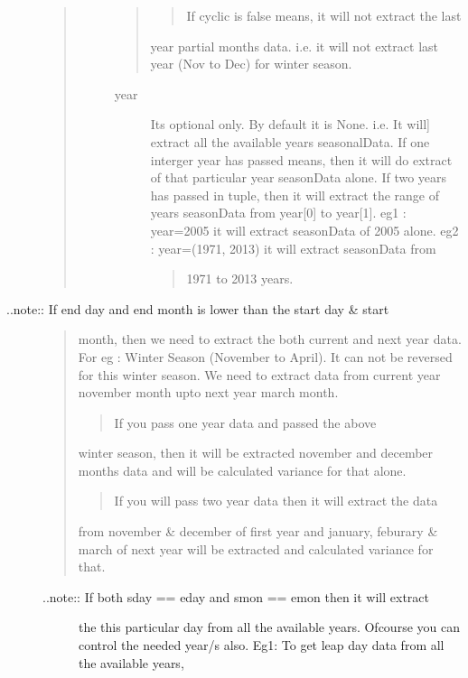 \documentclass[letterpaper,10pt,english]{sphinxmanual}
\begin{document}
\begin{fulllineitems}
\begin{fulllineitems}
\begin{description}
\begin{quote}
\begin{description}
\begin{quote}
\begin{quote}
If cyclic is false means, it will not extract the last
\end{quote}

year partial months data. i.e. it will not extract last year
(Nov to Dec) for winter season.
\end{quote}
\begin{description}
\item[{year}] \leavevmode{[}Its optional only. By default it is None. i.e. It will{]}
extract all the available years seasonalData.
If one interger year has passed means, then it will do
extract of that particular year seasonData alone.
If two years has passed in tuple, then it will extract
the range of years seasonData from year{[}0{]} to year{[}1{]}.
eg1 : year=2005 it will extract seasonData of 2005 alone.
eg2 : year=(1971, 2013) it will extract seasonData from
\begin{quote}

1971 to 2013 years.
\end{quote}

\end{description}

\end{description}
\end{quote}

\item[{..note:: If end day and end month is lower than the start day \& start}] \leavevmode\begin{quote}

month, then we need to extract the both current and next year
data. For eg : Winter Season (November to April).
It can not be reversed for this winter season. We need to
extract data from current year november month upto next year
march month.
\begin{quote}

If you pass one year data and passed the above
\end{quote}

winter season, then it will be extracted november and december
months data and will be calculated variance for that alone.
\begin{quote}

If you will pass two year data then it will extract the data
\end{quote}

from november \& december of first year and january, feburary \&
march of next year will be extracted and calculated variance
for that.
\end{quote}
\begin{description}
\item[{..note:: If both sday == eday and smon == emon then it will extract}] \leavevmode
the this particular day from all the available years.
Ofcourse you can control the needed year/s also.
Eg1: To get leap day data from all the available years,
\begin{quote}


\end{quote}
\end{description}
\end{description}
\end{fulllineitems}
\end{fulllineitems}
\end{document}
